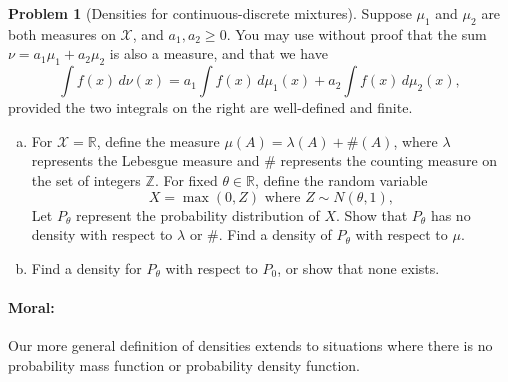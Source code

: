 \documentclass{article}
\newcommand{\cX}{\mathcal{X}}
\newcommand{\RR}{\mathbb{R}}
\newcommand{\ZZ}{\mathbb{Z}}
\theoremstyle{definition}
\newtheorem{problem}{Problem}
\begin{document}
\begin{problem}[Densities for continuous-discrete mixtures]
\label{prob:densities}
Suppose $\mu_1$ and $\mu_2$ are both measures on $\cX$, and $a_1,a_2 \geq 0$. You may use without proof that the sum $\nu = a_1\mu_1 + a_2\mu_2$ is also a measure, and that we have
\[
\int f(x)\,d \nu(x) = a_1\int f(x)\,d \mu_1(x) + a_2\int f(x)\,d \mu_2(x),
\]
provided the two integrals on the right are well-defined and finite.

\begin{enumerate}[(a)]
\item For $\cX = \RR$, define the measure $\mu(A) = \lambda(A) + \#(A)$, where $\lambda$ represents the Lebesgue measure and $\#$ represents the counting measure on the set of integers $\ZZ$. For fixed $\theta \in \RR$, define the random variable 
\[
X = \max(0,Z) \text{ where } Z \sim N(\theta, 1),
\]
Let $P_\theta$ represent the probability distribution of $X$. Show that $P_\theta$ has no density with respect to $\lambda$ or $\#$. Find a density of $P_\theta$ with respect to $\mu$.



\item Find a density for $P_\theta$ with respect to $P_0$, or show that none exists.



\end{enumerate}

\paragraph{Moral:} Our more general definition of densities extends to situations where there is no probability mass function or probability density function.
\end{problem}
\end{document}
